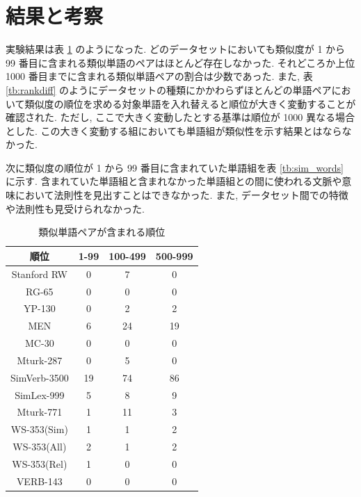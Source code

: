 \documentclass[twocolumn]{jarticle}     %
\begin{document}
\section{結果と考察}
実験結果は表 \ref{tb:result} のようになった. 
どのデータセットにおいても類似度が 1 から 99 番目に含まれる類似単語のペアはほとんど存在しなかった. 
それどころか上位 1000 番目までに含まれる類似単語ペアの割合は少数であった. 
また, 表 \ref{tb:rankdiff} のようにデータセットの種類にかかわらずほとんどの単語ペアにおいて類似度の順位を求める対象単語を入れ替えると順位が大きく変動することが確認された. 
ただし, ここで大きく変動したとする基準は順位が 1000 異なる場合とした. 
この大きく変動する組においても単語組が類似性を示す結果とはならなかった. 

次に類似度の順位が 1 から 99 番目に含まれていた単語組を表 \ref{tb:sim_words} に示す. 
含まれていた単語組と含まれなかった単語組との間に使われる文脈や意味において法則性を見出すことはできなかった. 
また, データセット間での特徴や法則性も見受けられなかった. 

\begin{table}[th]
  \caption{類似単語ペアが含まれる順位}
  \label{tb:result}
  \begin{tabular}{c|ccc}
    \hline
    順位           & 1-99 & 100-499 & 500-999 \\ \hline \hline
    Stanford RW  & 0    & 7       & 0       \\
    RG-65        & 0    & 0       & 0       \\
    YP-130       & 0    & 2       & 2       \\
    MEN          & 6    & 24      & 19      \\
    MC-30        & 0    & 0       & 0       \\
    Mturk-287    & 0    & 5       & 0       \\
    SimVerb-3500 & 19   & 74      & 86      \\
    SimLex-999   & 5    & 8       & 9       \\
    Mturk-771    & 1    & 11      & 3       \\
    WS-353(Sim)  & 1    & 1       & 2       \\
    WS-353(All)  & 2    & 1       & 2       \\
    WS-353(Rel)  & 1    & 0       & 0       \\
    VERB-143     & 0    & 0       & 0       \\ \hline
  \end{tabular}
\end{table}
\end{document}
